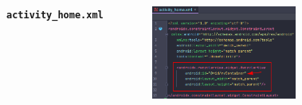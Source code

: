 \documentclass{beamer}
\begin{document}
\begin{frame}
\begin{columns}
\begin{figure}
        \end{figure}
        \indent \textbf{\texttt{activity\_home.xml}}
        \begin{figure}
            \centering
            \includegraphics[width=\textwidth]{images/14.png}
        \end{figure}
    \end{columns}
\end{frame}
\end{document}
